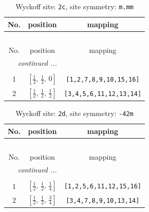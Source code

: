 \documentclass[fleqn,8pt]{jsarticle}
\begin{document}
\renewcommand{\arraystretch}{1.2}
\begin{longtable}{ccc}
\caption{Wyckoff site: {\tt 2c}, site symmetry: {\tt m.mm}}
 \\
 \hline \hline
No. & position & mapping \\ \hline \endfirsthead

\multicolumn{2}{l}{\tablename\ \thetable{}} \\
 \hline \hline
No. & position & mapping \\ \hline \endhead

 \hline \hline
\multicolumn{2}{r}{\footnotesize\it continued ...} \\ \endfoot

 \hline \hline
\multicolumn{2}{r}{} \\ \endlastfoot

1 & $\left[ \frac{1}{2},\, \frac{1}{2},\, 0 \right]$ & {\tt [1,2,7,8,9,10,15,16]} \\ \hline
2 & $\left[ \frac{1}{2},\, \frac{1}{2},\, \frac{1}{2} \right]$ & {\tt [3,4,5,6,11,12,13,14]} \\
\end{longtable}
\renewcommand{\arraystretch}{1.2}
\begin{longtable}{ccc}
\caption{Wyckoff site: {\tt 2d}, site symmetry: {\tt -42m}}
 \\
 \hline \hline
No. & position & mapping \\ \hline \endfirsthead

\multicolumn{2}{l}{\tablename\ \thetable{}} \\
 \hline \hline
No. & position & mapping \\ \hline \endhead

 \hline \hline
\multicolumn{2}{r}{\footnotesize\it continued ...} \\ \endfoot

 \hline \hline
\multicolumn{2}{r}{} \\ \endlastfoot

1 & $\left[ \frac{1}{2},\, \frac{1}{2},\, \frac{1}{4} \right]$ & {\tt [1,2,5,6,11,12,15,16]} \\ \hline
2 & $\left[ \frac{1}{2},\, \frac{1}{2},\, \frac{3}{4} \right]$ & {\tt [3,4,7,8,9,10,13,14]} \\
\end{longtable}
\renewcommand{\arraystretch}{1.2}
\end{document}
